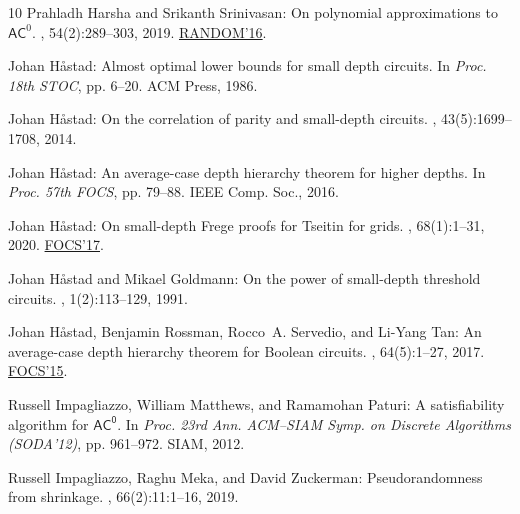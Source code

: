 \documentclass[11pt]{article}
\numberwithin{equation}{section}
\theoremstyle{definition}
\theoremstyle{plain}
\theoremstyle{plain}
\begin{document}
\begin{thebibliography}{10}
{\sc Prahladh Harsha and Srikanth Srinivasan}: On polynomial approximations to
  {$\mathsf{AC}^0$}.
, 54(2):289--303, 2019.
\newblock \prelim
  \href{https://doi.org/10.4230/LIPIcs.APPROX-RANDOM.2016.32}{RANDOM'16}.

{\sc Johan H{\aa}stad}: Almost optimal lower bounds for small depth circuits.
\newblock In {\em Proc. 18th STOC}, pp. 6--20. ACM Press, 1986.
\newblock [\epfmtdoi{10.1145/12130.12132}]

{\sc Johan H{\aa}stad}: On the correlation of parity and small-depth circuits.
, 43(5):1699--1708, 2014.

{\sc Johan H{\aa}stad}: An average-case depth hierarchy theorem for higher
  depths.
\newblock In {\em Proc. 57th FOCS}, pp. 79--88. IEEE Comp. Soc., 2016.

{\sc Johan H{\aa}stad}: On small-depth {F}rege proofs for {T}seitin for grids.
, 68(1):1--31, 2020.
\newblock \prelim \href{https://doi.org/10.1109/FOCS.2017.18}{FOCS'17}.

{\sc Johan H{\aa}stad and Mikael Goldmann}: On the power of small-depth
  threshold circuits.
, 1(2):113--129, 1991.
\newblock [\epfmtdoi{10.1007/BF01272517}]

{\sc Johan H{\aa}stad, Benjamin Rossman, Rocco~A. Servedio, and Li-Yang Tan}:
  An average-case depth hierarchy theorem for {B}oolean circuits.
, 64(5):1--27, 2017.
\newblock \prelim \href{https://doi.org/10.1109/FOCS.2015.67}{FOCS'15}.

{\sc Russell Impagliazzo, William Matthews, and Ramamohan Paturi}: A
  satisfiability algorithm for $\mathsf{AC^0}$.
\newblock In {\em Proc. 23rd Ann. ACM--SIAM Symp. on Discrete Algorithms
  (SODA'12)}, pp. 961--972. SIAM, 2012.
\newblock [\epfmtdoi{10.1137/1.9781611973099.77}]

{\sc Russell Impagliazzo, Raghu Meka, and David Zuckerman}: Pseudorandomness
  from shrinkage.
, 66(2):11:1--16, 2019.
\newblock [\epfmtdoi{10.1145/3230630}]


\end{thebibliography}
\end{document}
